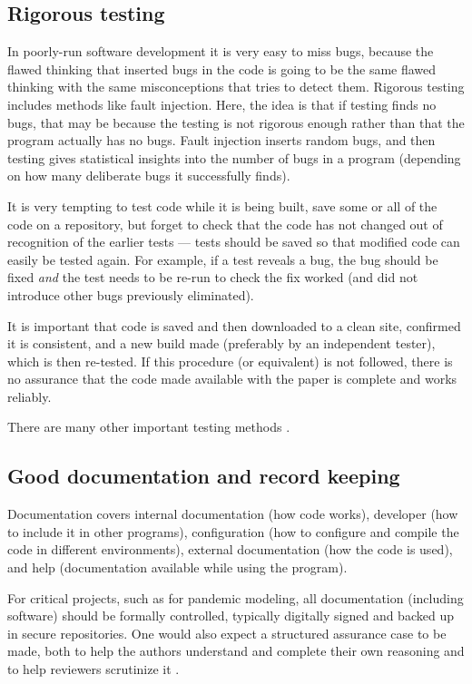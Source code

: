 \documentclass[10pt,a4paper]{article}
\begin{document}
\subsection{Rigorous testing}
In poorly-run software development it is very easy to miss bugs, because the flawed thinking that inserted bugs in the code is going to be the same flawed thinking with the same misconceptions that tries to detect them. Rigorous testing includes methods like fault injection. Here, the idea is that if testing finds no bugs, that may be because the testing is not rigorous enough rather than that the program actually has no bugs. Fault injection inserts random bugs, and then testing gives statistical insights into the number of bugs in a program (depending on how many deliberate bugs it successfully finds). 

It is very tempting to test code while it is being built, save some or all of the code on a repository, but forget to check that the code has not changed out of recognition of the earlier tests --- tests should be saved so that modified code can easily be tested again. For example, if a test reveals a bug, the bug should be fixed \emph{and\/} the test needs to be re-run to check the fix worked (and did not introduce other bugs previously eliminated). 

It is important that code is saved and then downloaded to a clean site, confirmed it is consistent, and a new build made (preferably by an independent tester), which is then re-tested. If this procedure (or equivalent) is not followed, there is no assurance that the code made available with the paper is complete and works reliably.

There are many other important testing methods \cite{sommerville,knight,NVP}.

\subsection{Good documentation and record keeping}
Documentation covers internal documentation (how code works), developer (how to include it in other programs), configuration (how to configure and compile the code in different environments), external documentation (how the code is used), and help (documentation available while using the program). 

{For critical projects, such as for pandemic modeling, all documentation (including software) should be formally controlled, typically digitally signed and backed up in secure repositories. One would also expect a structured assurance case to be made, both to help the authors understand and complete their own reasoning and to help reviewers scrutinize it \cite{assurance-case}.
}
\end{document}
